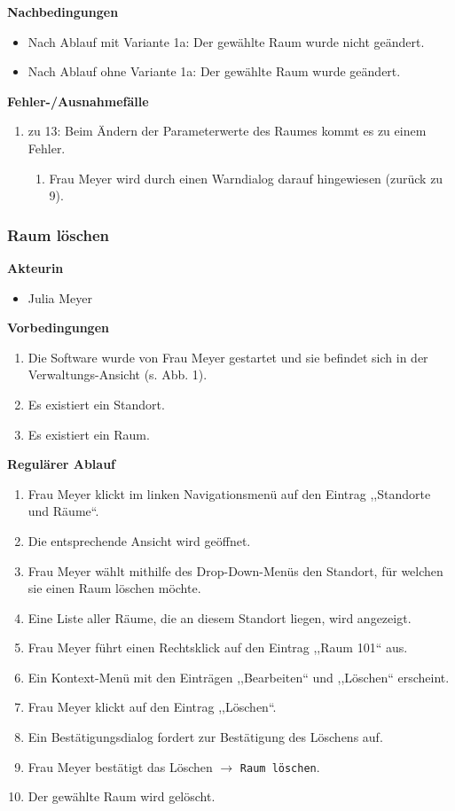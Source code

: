 \documentclass[fontsize=12pt,paper=a4,twoside]{scrartcl}
\begin{document}
\textbf{Nachbedingungen}
\begin{itemize}
\item Nach Ablauf mit Variante 1a: Der gewählte Raum wurde nicht geändert.
\item Nach Ablauf ohne Variante 1a: Der gewählte Raum wurde geändert.
\end{itemize}
\vspace{5pt}

\textbf{Fehler-/Ausnahmefälle}
\begin{enumerate}
\item zu 13: Beim Ändern der Parameterwerte des Raumes kommt es zu einem Fehler.
	\begin{enumerate}[label=\arabic*.]
	\item Frau Meyer wird durch einen Warndialog darauf hingewiesen (zurück zu 9).
	\end{enumerate}
\end{enumerate}

\subsubsection{Raum löschen}
\textbf{Akteurin}
\begin{itemize}
\item Julia Meyer
\end{itemize}
\vspace{5pt}

\textbf{Vorbedingungen}
\begin{enumerate}
\item Die Software wurde von Frau Meyer gestartet und sie befindet sich in der Verwaltungs-Ansicht (s. Abb. 1).
\item Es existiert ein Standort.
\item Es existiert ein Raum.
\end{enumerate}
\vspace{5pt}

\textbf{Regulärer Ablauf}
\begin{enumerate}
\item Frau Meyer klickt im linken Navigationsmenü auf den Eintrag ,,Standorte und Räume``.
\item Die entsprechende Ansicht wird geöffnet.
\item Frau Meyer wählt mithilfe des Drop-Down-Menüs den Standort, für welchen sie einen Raum löschen möchte.
\item Eine Liste aller Räume, die an diesem Standort liegen, wird angezeigt.
\item Frau Meyer führt einen Rechtsklick auf den Eintrag ,,Raum 101`` aus.
\item Ein Kontext-Menü mit den Einträgen ,,Bearbeiten`` und ,,Löschen`` erscheint.
\item Frau Meyer klickt auf den Eintrag ,,Löschen``.
\item Ein Bestätigungsdialog fordert zur Bestätigung des Löschens auf.
\item Frau Meyer bestätigt das Löschen $\rightarrow$ \texttt{Raum löschen}.
\item Der gewählte Raum wird gelöscht.
\end{enumerate}
\vspace{5pt}
\end{document}
